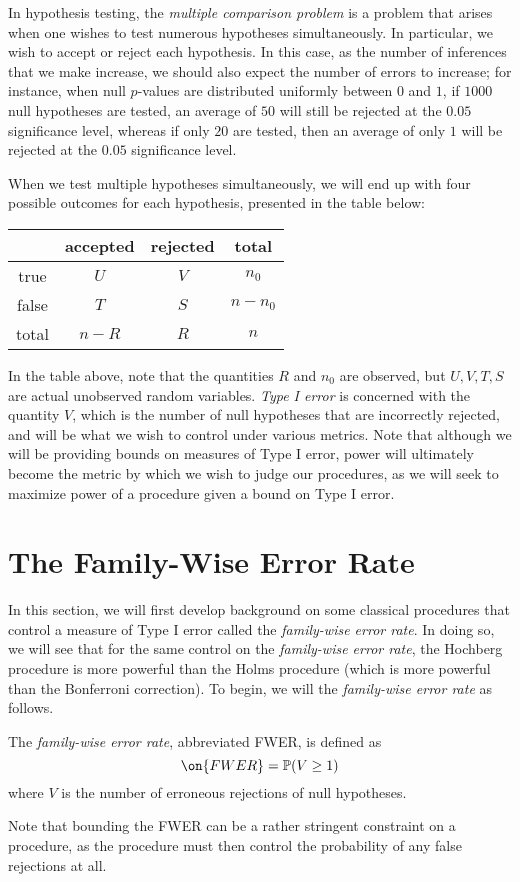 
\label{chapter1}
In hypothesis testing, the \emph{multiple comparison problem} is a problem that arises when one wishes to test numerous hypotheses simultaneously. In particular, we wish to accept or reject each hypothesis. In this case, as the number of inferences that we make increase, we should also expect the number of errors to increase; for instance, when null $p$-values are distributed uniformly between $0$ and $1$, if $1000$ null hypotheses are tested, an average of $50$ will still be rejected at the $0.05$ significance level, whereas if only $20$ are tested, then an average of only $1$ will be rejected at the $0.05$ significance level.

When we test multiple hypotheses simultaneously, we will end up with four possible outcomes for each hypothesis, presented in the table below:
\begin{center}
\begin{tabular}{c|cc|c}
& accepted & rejected & total \\ \hline
true & $U$ & $V$ & $n_0$ \\ 
false & $T$ & $S$ & $n - n_0$ \\ \hline
total & $n - R$ & $R$ & $n$
\end{tabular}
\end{center}
In the table above, note that the quantities $R$ and $n_0$ are observed, but $U,V,T,S$ are actual unobserved random variables. \emph{Type I error} is concerned with the quantity $V$, which is the number of null hypotheses that are incorrectly rejected, and will be what we wish to control under various metrics. Note that although we will be providing bounds on measures of Type I error, power will ultimately become the metric by which we wish to judge our procedures, as we will seek to maximize power of a procedure given a bound on Type I error.
\section{The Family-Wise Error Rate}
In this section, we will first develop background on some classical procedures that control a measure of Type I error called the \emph{family-wise error rate}. In doing so, we will see that for the same control on the \emph{family-wise error rate}, the Hochberg procedure is more powerful than the Holms procedure (which is more powerful than the Bonferroni correction). To begin, we will the \emph{family-wise error rate} as follows.
\begin{defn}
The \emph{family-wise error rate}, abbreviated FWER, is defined as
\begin{equation}
\on{FWER} = \mathbb{P}(V \geq  1)
\end{equation}
where $V$ is the number of erroneous rejections of null hypotheses.
\end{defn}
Note that bounding the FWER can be a rather stringent constraint on a procedure, as the procedure must then control the probability of any false rejections at all.

